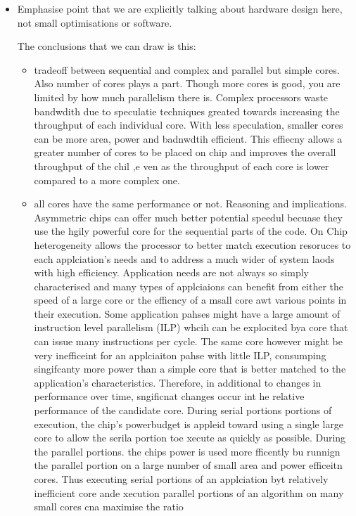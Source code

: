 \begin{itemize}
\begin{itemize}
\end{itemize}
\item Emphasise point that we are explicitly talking about hardware design here, 
not small optimisations or software. 

The conclusions that we can draw is this: 
\begin{itemize}
\item tradeoff between sequential and complex and parallel but simple cores. 
Also number of cores plays a part. Though more cores is good, you 
are limited by how much parallelism there is. 
Complex processors waste bandwdith due to 
speculatie techniques greated towards increasing the throughput
of each individual core. With less speculation, smaller cores can be more
area, power and badnwdtih efficient. This effiecny allows
a greater number of cores to be placed on chip and improves the overall
throughput of the chil ,e ven as the throughput of each core is lower compared to a more 
complex one. 
\item all cores have the same performance or not. Reasoning and implications.
Asymmetric chips can offer much better potential speedul
becuase they use the hgily powerful core
for the sequential parts of the code. On Chip heterogeneity allows the processor to better match
execution resoruces to each applciation's needs and to address a much 
wider of system laods with high efficiency.  Application
needs are not always so simply characterised and many types
of applciaions can benefit from either the speed of a large core or the efficncy of a msall core awt various points in their execution. 
Some application pahses might have a large amount of instruction level parallelism (ILP) whcih can be explocited bya core that can issue many instructions per cycle. The same core however might be very inefficeint for an applciaiton pahse with little ILP, consumping singifcanty more power than a simple core that is better matched to the application's characteristics. Therefore, in additional to changes in performance over time, sngificnat changes occur int he relative performance of the candidate core.  During serial portions  portions of execution, the chip's powerbudget is appleid toward using a single large core to allow the serila portion toe xecute as quickly as possible. 
During the parallel portions. the chips power is used more fficently bu runnign the parallel portion on a large number of small area and power efficeitn cores. Thus executing serial portions of an applciation byt relatively inefficient core ande xecution parallel portions of an algorithm on many small cores cna maximise the ratio 

\end{itemize}
\end{itemize}
